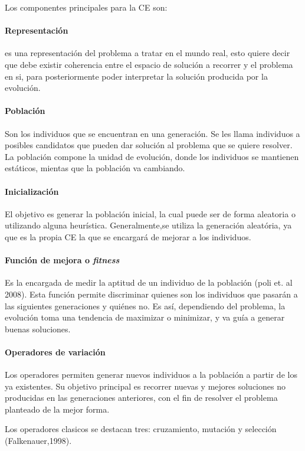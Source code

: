 Los componentes principales para la CE son:
\paragraph{Representación} es una representación del problema a tratar en el mundo real, esto quiere decir que debe existir coherencia entre el espacio de solución a recorrer y el problema en si, para posteriormente poder interpretar la solución producida por la evolución.

\paragraph{Población} Son los individuos que se encuentran en una generación. Se les llama individuos a posibles candidatos que pueden dar solución al problema que se quiere resolver. La población compone la unidad de evolución, donde los individuos se mantienen estáticos, mientas que la población va cambiando.

\paragraph{Inicialización} El objetivo es generar la población inicial, la cual puede ser de forma aleatoria o utilizando alguna heurística. Generalmente,se utiliza la generación aleatória, ya que es la propia CE la que se encargará de mejorar a los individuos.

\paragraph{Función de mejora o {\it fitness}} Es la encargada de medir la aptitud de un individuo de la población (poli et. al 2008). Esta función permite discriminar quienes son los individuos que pasarán a las siguientes generaciones y quiénes no. Es así, dependiendo del problema, la evolución toma una tendencia de maximizar o minimizar, y va guía a generar buenas soluciones.

\paragraph{Operadores de variación} Los operadores permiten generar nuevos individuos a la población a partir de los ya existentes. Su objetivo principal es recorrer nuevas y mejores soluciones no producidas en las generaciones anteriores, con el fin de resolver el problema planteado de la mejor forma.

Los operadores clasicos se destacan tres: cruzamiento, mutación y selección (Falkenauer,1998).
